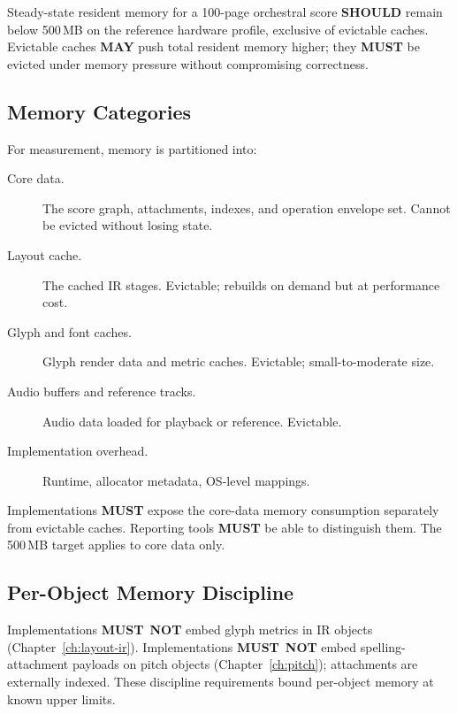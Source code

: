 \documentclass[11pt,letterpaper]{report}
\newcounter{requirement}[chapter]
\newcommand{\MUST}{\textbf{MUST}}
\newcommand{\MUSTNOT}{\textbf{MUST}\nobreak\ \textbf{NOT}}
\newcommand{\SHOULD}{\textbf{SHOULD}}
\newcommand{\MAY}{\textbf{MAY}}
\begin{document}
\begin{requirement}
  \label{req:perf:core-memory-budget}
  Steady-state resident memory for a 100-page orchestral score
  \SHOULD{} remain below 500\,MB on the reference hardware profile,
  exclusive of evictable caches. Evictable caches \MAY{} push total
  resident memory higher; they \MUST{} be evicted under memory
  pressure without compromising correctness.
\end{requirement}

\subsection{Memory Categories}

For measurement, memory is partitioned into:

\begin{description}
  \item[Core data.] The score graph, attachments, indexes, and
    operation envelope set. Cannot be evicted without losing
    state.
  \item[Layout cache.] The cached IR stages. Evictable; rebuilds on
    demand but at performance cost.
  \item[Glyph and font caches.] Glyph render data and metric caches.
    Evictable; small-to-moderate size.
  \item[Audio buffers and reference tracks.] Audio data loaded for
    playback or reference. Evictable.
  \item[Implementation overhead.] Runtime, allocator metadata,
    OS-level mappings.
\end{description}

\begin{requirement}
  \label{req:perf:memory-category-reporting}
  Implementations \MUST{} expose the core-data memory consumption
  separately from evictable caches. Reporting tools \MUST{} be able
  to distinguish them. The 500\,MB target applies to core data only.
\end{requirement}

\subsection{Per-Object Memory Discipline}

\begin{requirement}
  \label{req:perf:per-object-memory-layout}
  Implementations \MUSTNOT{} embed glyph metrics in IR objects
  (Chapter~\ref{ch:layout-ir}). Implementations \MUSTNOT{} embed
  spelling-attachment payloads on pitch objects
  (Chapter~\ref{ch:pitch}); attachments are externally indexed.
  These discipline requirements bound per-object memory at known
  upper limits.
\end{requirement}
\end{document}
